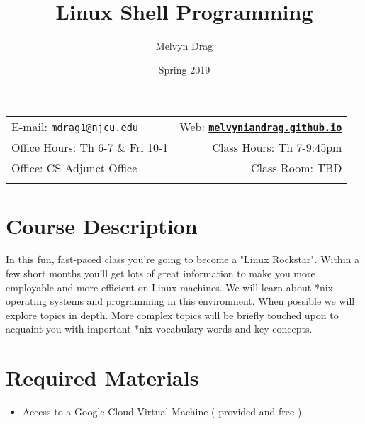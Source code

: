 \documentclass[11pt]{article}
\title{Linux Shell Programming}
\author{Melvyn Drag}
\date{Spring 2019}
\newcommand{\blankline}{\quad\pagebreak[2]}
\begin{document}
\maketitle

\blankline

\begin{tabular*}{.93\textwidth}{@{\extracolsep{\fill}}lr}


E-mail: \texttt{mdrag1@njcu.edu} & Web: \href{melvyniandrag.github.io}{\tt\bf melvyniandrag.github.io}  \\

 Office Hours: Th 6-7 \& Fri 10-1  &  Class Hours: Th 7-9:45pm \\

 Office: CS Adjunct Office & Class Room: TBD \\
 & \\
\hline
\end{tabular*}

\vspace{5 mm}


\section*{Course Description}

In this fun, fast-paced class you're going to become a "Linux Rockstar". Within a few short months you'll get lots of great information to make you more employable and more efficient on Linux machines. We will learn about *nix operating systems and programming in this environment.  When possible we will explore topics in depth. More complex topics will be briefly touched upon to acquaint you with important *nix vocabulary words and key concepts.


\section*{Required Materials}

\begin{itemize}
\item Access to a Google Cloud Virtual Machine ( provided and free ).
\end{itemize}
\end{document}

